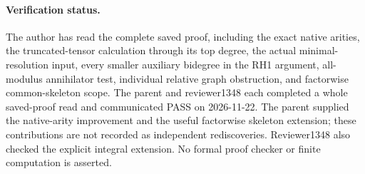 \paragraph{Verification status.}
The author has read the complete saved proof, including the exact
native arities, the truncated-tensor calculation through its top
degree, the actual minimal-resolution input, every smaller auxiliary
bidegree in the RH1 argument, all-modulus annihilator test, individual
relative graph obstruction, and factorwise common-skeleton scope.
The parent and reviewer1348 each completed a whole saved-proof
read and communicated PASS on 2026-11-22. The parent supplied
the native-arity improvement and the useful factorwise skeleton
extension; these contributions are not recorded as independent
rediscoveries. Reviewer1348 also checked the explicit integral
extension. No formal proof checker or finite computation is asserted.
